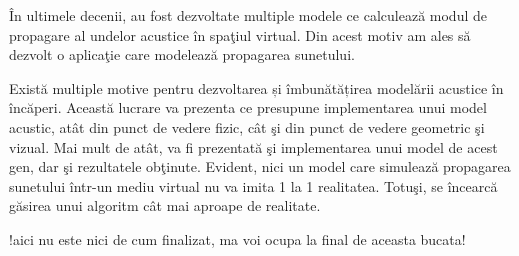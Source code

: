 	\^{I}n ultimele decenii, au fost dezvoltate multiple modele ce calculeaz\u{a} modul de propagare al undelor acustice \^{i}n spa\c{t}iul virtual. Din acest motiv am ales s\u{a} dezvolt o aplica\c{t}ie care modeleaz\u{a} propagarea sunetului.
	\bigskip
	
	Exist\u{a} multiple motive pentru dezvoltarea și îmbunătățirea model\u{a}rii acustice \^{i}n \^{i}nc\u{a}peri. Aceast\u{a} lucrare va prezenta ce presupune implementarea unui model acustic, at\^{a}t din punct de vedere fizic, c\^{a}t \c{s}i din punct de vedere geometric \c{s}i vizual. Mai mult de at\^{a}t, va fi prezentat\u{a} \c{s}i implementarea unui model de acest gen, dar \c{s}i rezultatele ob\c{t}inute. Evident, nici un model care simuleaz\u{a} propagarea sunetului \^{i}ntr-un mediu virtual nu va imita 1 la 1 realitatea. Totu\c{s}i, se \^{i}ncearc\u{a} g\u{a}sirea unui algoritm c\^{a}t mai aproape de realitate.
	\bigskip


!aici nu este nici de cum finalizat, ma voi ocupa la final de aceasta bucata!